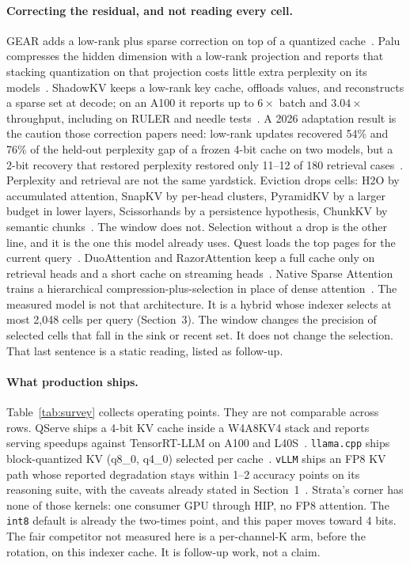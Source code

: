 \documentclass[10pt,twocolumn]{article}
\begin{document}
\paragraph{Correcting the residual, and not reading every cell.}
GEAR adds a low-rank plus sparse correction on top of a quantized cache~\cite{gear}. Palu compresses the hidden dimension with a low-rank projection and reports that stacking quantization on that projection costs little extra perplexity on its models~\cite{palu}. ShadowKV keeps a low-rank key cache, offloads values, and reconstructs a sparse set at decode; on an A100 it reports up to $6\times$ batch and $3.04\times$ throughput, including on RULER and needle tests~\cite{shadowkv}. A 2026 adaptation result is the caution those correction papers need: low-rank updates recovered 54\% and 76\% of the held-out perplexity gap of a frozen 4-bit cache on two models, but a 2-bit recovery that restored perplexity restored only 11--12 of 180 retrieval cases~\cite{kvadapt}. Perplexity and retrieval are not the same yardstick. Eviction drops cells: H2O by accumulated attention, SnapKV by per-head clusters, PyramidKV by a larger budget in lower layers, Scissorhands by a persistence hypothesis, ChunkKV by semantic chunks~\cite{h2o,snapkv,pyramidkv,scissorhands,chunkkv}. The window does not. Selection without a drop is the other line, and it is the one this model already uses. Quest loads the top pages for the current query~\cite{quest}. DuoAttention and RazorAttention keep a full cache only on retrieval heads and a short cache on streaming heads~\cite{duoattn,razorattn}. Native Sparse Attention trains a hierarchical compression-plus-selection in place of dense attention~\cite{nsa}. The measured model is not that architecture. It is a hybrid whose indexer selects at most 2,048 cells per query (Section~3). The window changes the precision of selected cells that fall in the sink or recent set. It does not change the selection. That last sentence is a static reading, listed as follow-up.

\paragraph{What production ships.}
Table~\ref{tab:survey} collects operating points. They are not comparable across rows. QServe ships a 4-bit KV cache inside a W4A8KV4 stack and reports serving speedups against TensorRT-LLM on A100 and L40S~\cite{qserve}. \texttt{llama.cpp} ships block-quantized KV (q8\_0, q4\_0) selected per cache~\cite{llama-cpp}. \texttt{vLLM} ships an FP8 KV path whose reported degradation stays within 1--2 accuracy points on its reasoning suite, with the caveats already stated in Section~1~\cite{vllm-fp8}. Strata's corner has none of those kernels: one consumer GPU through HIP, no FP8 attention. The \texttt{int8} default is already the two-times point, and this paper moves toward 4 bits. The fair competitor not measured here is a per-channel-K arm, before the rotation, on this indexer cache. It is follow-up work, not a claim.
\end{document}
